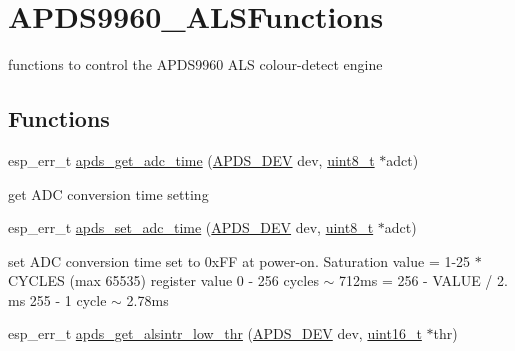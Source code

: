 \hypertarget{group__APDS9960__ALSFunctions}{}\section{A\+P\+D\+S9960\+\_\+\+A\+L\+S\+Functions}
\label{group__APDS9960__ALSFunctions}


functions to control the A\+P\+D\+S9960 A\+LS colour-\/detect engine  


\subsection*{Functions}
\begin{DoxyCompactItemize}
\item 
esp\+\_\+err\+\_\+t \hyperlink{group__APDS9960__ALSFunctions_ga0fc20a4645aa31c7416fa12d0514d8f0}{apds\+\_\+get\+\_\+adc\+\_\+time} (\hyperlink{structAPDS9960__Driver}{A\+P\+D\+S\+\_\+\+D\+EV} dev, \hyperlink{vl53l0x__types_8h_aba7bc1797add20fe3efdf37ced1182c5}{uint8\+\_\+t} $\ast$adct)
\begin{DoxyCompactList}\small\item\em 
\begin{DoxyItemize}
\item get A\+DC conversion time setting 
\end{DoxyItemize}\end{DoxyCompactList}\item 
esp\+\_\+err\+\_\+t \hyperlink{group__APDS9960__ALSFunctions_gaf21170ec2a4971b7c138f90eac0a26ec}{apds\+\_\+set\+\_\+adc\+\_\+time} (\hyperlink{structAPDS9960__Driver}{A\+P\+D\+S\+\_\+\+D\+EV} dev, \hyperlink{vl53l0x__types_8h_aba7bc1797add20fe3efdf37ced1182c5}{uint8\+\_\+t} $\ast$adct)
\begin{DoxyCompactList}\small\item\em 
\begin{DoxyItemize}
\item set A\+DC conversion time set to 0x\+FF at power-\/on. Saturation value = 1-\/25 $\ast$ C\+Y\+C\+L\+ES (max 65535) register value 0 -\/ 256 cycles $\sim$ 712ms = 256 -\/ V\+A\+L\+UE / 2. ms 255 -\/ 1 cycle $\sim$ 2.\+78ms 
\end{DoxyItemize}\end{DoxyCompactList}\item 
esp\+\_\+err\+\_\+t \hyperlink{group__APDS9960__ALSFunctions_gafeb7a3dee00d64dfd379a611afdde790}{apds\+\_\+get\+\_\+alsintr\+\_\+low\+\_\+thr} (\hyperlink{structAPDS9960__Driver}{A\+P\+D\+S\+\_\+\+D\+EV} dev, \hyperlink{vl53l0x__types_8h_a273cf69d639a59973b6019625df33e30}{uint16\+\_\+t} $\ast$thr)

\end{DoxyCompactItemize}
